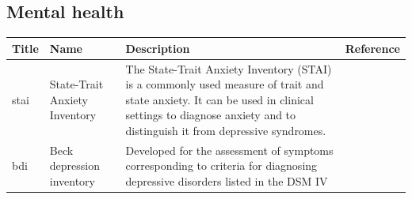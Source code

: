 \documentclass[]{book}
\begin{document}
\hypertarget{mental-health-1}{%
\subsection{Mental health}\label{mental-health-1}}

\begin{longtable}[]{@{}llll@{}}
\toprule
\begin{minipage}[b]{0.22\columnwidth}\raggedright
Title\strut
\end{minipage} & \begin{minipage}[b]{0.27\columnwidth}\raggedright
Name\strut
\end{minipage} & \begin{minipage}[b]{0.22\columnwidth}\raggedright
Description\strut
\end{minipage} & \begin{minipage}[b]{0.18\columnwidth}\raggedright
Reference\strut
\end{minipage}\tabularnewline
\midrule
\endhead
\begin{minipage}[t]{0.22\columnwidth}\raggedright
stai\strut
\end{minipage} & \begin{minipage}[t]{0.27\columnwidth}\raggedright
State-Trait Anxiety Inventory\strut
\end{minipage} & \begin{minipage}[t]{0.22\columnwidth}\raggedright
The State-Trait Anxiety Inventory (STAI) is a commonly used measure of trait and state anxiety. It can be used in clinical settings to diagnose anxiety and to distinguish it from depressive syndromes.\strut
\end{minipage} & \begin{minipage}[t]{0.18\columnwidth}\raggedright
\strut
\end{minipage}\tabularnewline
\begin{minipage}[t]{0.22\columnwidth}\raggedright
bdi\strut
\end{minipage} & \begin{minipage}[t]{0.27\columnwidth}\raggedright
Beck depression inventory\strut
\end{minipage} & \begin{minipage}[t]{0.22\columnwidth}\raggedright
Developed for the assessment of symptoms corresponding to criteria for diagnosing depressive disorders listed in the DSM IV\strut
\end{minipage} & \begin{minipage}[t]{0.18\columnwidth}\raggedright

\end{minipage}
\end{longtable}
\end{document}
